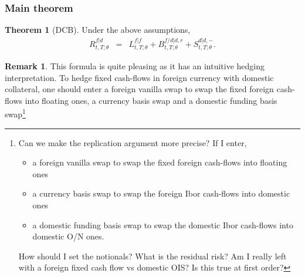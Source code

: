 \documentclass[11pt,english]{amsart}
\theoremstyle{definition}
\newtheorem{theo}{Theorem}
\newtheorem{rema}{Remark}
\begin{document}
\subsubsection{Main theorem}%

\begin{theo}[DCB]
Under the above assumptions, 
\begin{eqnarray}
  R^{f|d}_{t,T;\theta} &=& L^{f|f}_{t,T;\theta} + B^{f/d|d,r}_{t,T;\theta}  + S^{d|d,-}_{t,T;\theta}  .
  \label{eq:differential_discounting}
\end{eqnarray} 
\end{theo}

\begin{rema}
This formula is quite pleasing as it has an intuitive hedging interpretation. To hedge fixed cash-flows in foreign currency with domestic collateral, one should enter a foreign vanilla swap to swap the fixed foreign cash-flows into floating ones, a currency basis swap and a domestic funding basis swap\footnote{Can we make the replication argument more precise? If I enter, 
\begin{itemize}
\item a foreign vanilla swap to swap the fixed foreign cash-flows into floating ones
\item a currency basis swap to swap the foreign Ibor cash-flows into domestic ones 
\item a domestic funding basis swap to swap the domestic Ibor cash-flows into domestic O/N ones. 
\end{itemize}
How should I set the notionals? What is the residual risk? Am I really left with a foreign fixed cash flow vs domestic OIS? Is this true at first order? 
}
\end{rema}
\end{document}
